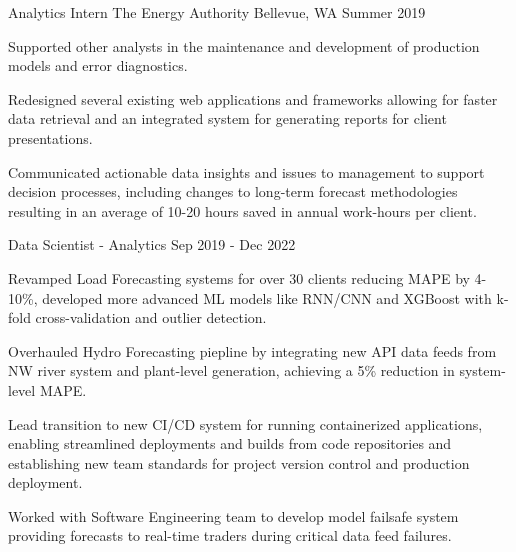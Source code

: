 \begin{cventries}
  \cventrytwopositions
    {Analytics Intern}
    {The Energy Authority}
    {Bellevue, WA}
    {Summer 2019}
    {
      \begin{cvitems} %
        \item {Supported other analysts in the maintenance and development of production models and error diagnostics.}
        \item {Redesigned several existing web applications and frameworks allowing for faster data retrieval and an integrated system for generating reports for client presentations.}
        \item {Communicated actionable data insights and issues to management to support decision processes, including changes to long-term forecast methodologies resulting in an average of 10-20 hours saved in annual work-hours per client.}
      \end{cvitems}
    }
    {Data Scientist - Analytics}
    {Sep 2019 - Dec 2022}
    {
      \begin{cvitems} %
        \item {Revamped Load Forecasting systems for over 30 clients reducing MAPE by 4-10\%, developed more advanced ML models like RNN/CNN and XGBoost with k-fold cross-validation and outlier detection.}
        \item {Overhauled Hydro Forecasting piepline by integrating new API data feeds from NW river system and plant-level generation, achieving a 5\% reduction in system-level MAPE.}
        \item {Lead transition to new CI/CD system for running containerized applications, enabling streamlined deployments and builds from code repositories and establishing new team standards for project version control and production deployment.}
        \item {Worked with Software Engineering team to develop model failsafe system providing forecasts to real-time traders during critical data feed failures.}
      \end{cvitems}
    }


\end{cventries}
